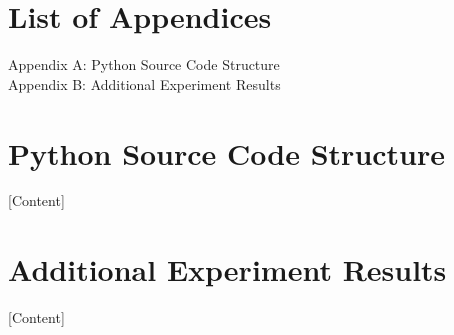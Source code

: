 \documentclass[11pt, a4paper, twoside]{article}
\begin{document}
\listoffigures
{}

\listoftables
{}

\section*{List of Appendices}
\noindent
Appendix A: Python Source Code Structure \\
Appendix B: Additional Experiment Results

\appendix

\section{Python Source Code Structure}
[Content]

\section{Additional Experiment Results}
[Content]
\end{document}
